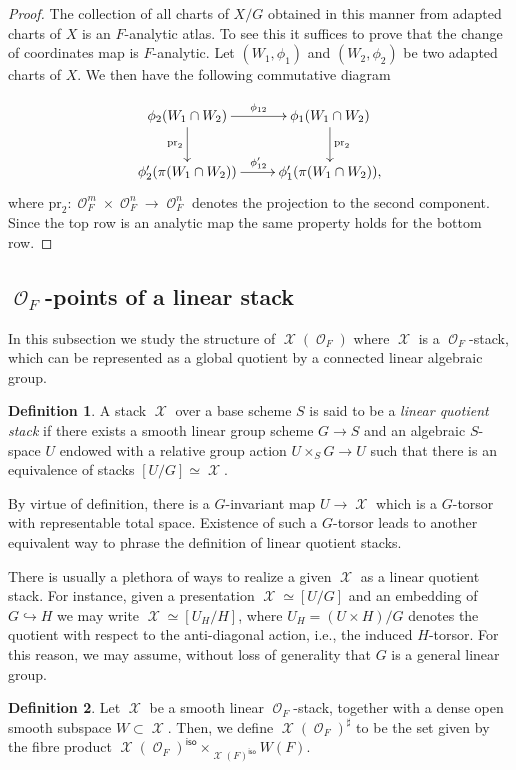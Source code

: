 \documentclass{article}
\DeclareMathOperator{\iso}{\mathsf{iso}}
\DeclareMathOperator{\Xc}{\mathcal{X}}
\DeclareMathOperator{\Oc}{\mathcal{O}}
\theoremstyle{definition}
\newtheorem{definition}{Definition}[section]
\theoremstyle{plain}
\begin{document}
\begin{proof}
The collection of all charts of $X/G$ obtained in this manner from adapted charts of $X$ is an $F$-analytic atlas. To see this it suffices to prove that the change of coordinates map is $F$-analytic. Let $(W_1,\phi_1)$ and $(W_2,\phi_2)$ be two adapted charts of $X$. We then have the following commutative diagram

\[
\xymatrix{
\phi_2(W_1 \cap W_2) \ar[r]^{\phi_{12}} \ar[d]_{\mathrm{pr}_2} & \phi_1(W_1 \cap W_2) \ar[d]^{\mathrm{pr}_2} \\
\phi'_2(\pi(W_1\cap W_2)) \ar[r]^{\phi'_{12}} & \phi'_1(\pi(W_1\cap W_2)),
}
\]
where $\mathrm{pr}_2\colon \Oc_F^m \times \Oc_F^n \to \Oc_F^n$ denotes the projection to the second component.
Since the top row is an analytic map the same property holds for the bottom row.
\end{proof}


\subsection{$\Oc_F$-points of a linear stack}

In this subsection we study the structure of $\Xc(\Oc_F)$ where $\Xc$ is a $\Oc_F$-stack, which can be represented as a global quotient by a connected linear algebraic group.

\begin{definition}
A stack $\Xc$ over a base scheme $S$ is said to be a \emph{linear quotient stack} if there exists a smooth linear group scheme $G \to S$ and an algebraic $S$-space $U$ endowed with a relative group action $U \times_S G \to U$ such that there is an equivalence of stacks $[U/G] \simeq \Xc$.\end{definition}

By virtue of definition, there is a $G$-invariant map $U \to \Xc$ which is a $G$-torsor with representable total space. Existence of such a $G$-torsor leads to another equivalent way to phrase the definition of linear quotient stacks.

There is usually a plethora of ways to realize a given $\Xc$ as a linear quotient stack. For instance, given a presentation $\Xc \simeq [U/G]$ and an embedding of $G \hookrightarrow H$ we may write
$\Xc \simeq [U_H / H]$, where $U_H = (U \times H)/G$ denotes the quotient with respect to the anti-diagonal action, i.e., the induced $H$-torsor. For this reason, we may assume, without loss of generality that $G$ is a general linear group.


\begin{definition}\label{defi:hashtag}
Let $\Xc$ be a smooth linear $\Oc_F$-stack, together with a dense open smooth subspace $W \subset \Xc$. Then, we define $\Xc(\Oc_F)^{\sharp}$ to be the set given by the fibre product $\Xc(\Oc_F)^{\iso} \times_{\Xc(F)^{\iso}} W(F)$.
\end{definition}
\end{document}
